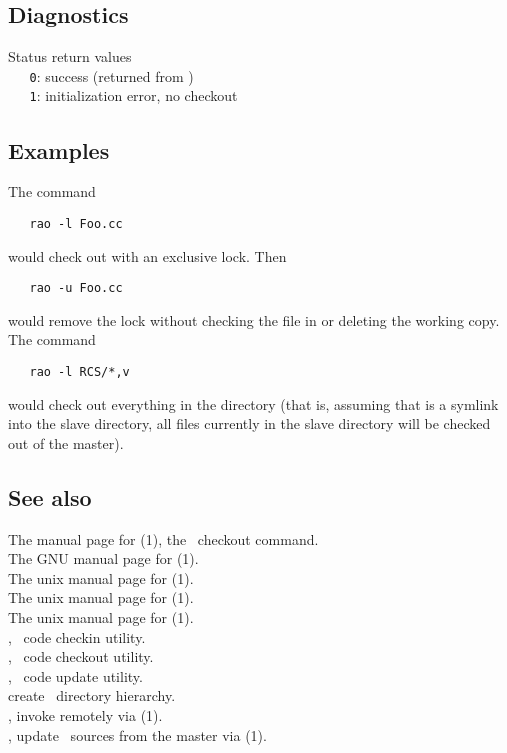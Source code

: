 \subsection*{Diagnostics}
 
Status return values
\\ \verb+   0+:  success (returned from )
\\ \verb+   1+:  initialization error, no checkout

\subsection*{Examples}
 
The command
 
\begin{verbatim}
   rao -l Foo.cc
\end{verbatim}
 
\noindent
would check out  with an exclusive lock.  Then
 
\begin{verbatim}
   rao -u Foo.cc
\end{verbatim}
 
\noindent
would remove the lock without checking the file in or deleting the working
copy.  The command
 
\begin{verbatim}
   rao -l RCS/*,v
\end{verbatim}
 
\noindent
would check out everything in the directory (that is, assuming that 
is a symlink into the slave directory, all files currently in the slave
directory will be checked out of the master).

\subsection*{See also}
 
The manual page for (1), the \rcs\ checkout command.\\
The GNU manual page for (1).\\
The unix manual page for (1).\\
The unix manual page for (1).\\
The unix manual page for (1).\\
, \aipspp\ code checkin utility.\\
, \aipspp\ code checkout utility.\\
, \aipspp\ code update utility.\\
 create \aipspp\ directory hierarchy.\\
, invoke  remotely via (1).\\
, update \aipspp\ sources from the master via (1).

